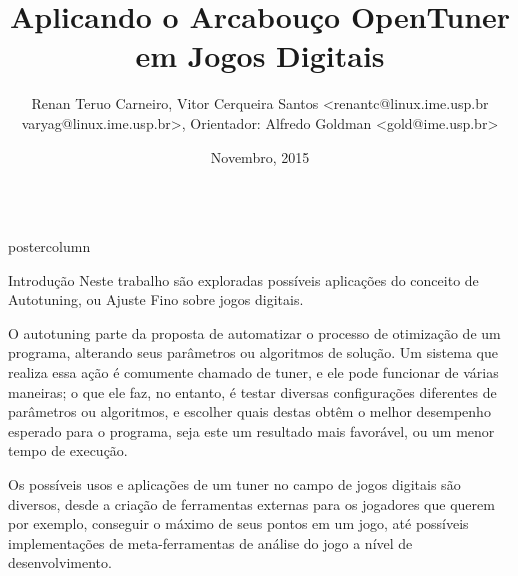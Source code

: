 \documentclass[final]{beamer}
\title{\huge Aplicando o Arcabouço OpenTuner em Jogos Digitais}
\author{Renan Teruo Carneiro, Vitor Cerqueira Santos <renantc@linux.ime.usp.br varyag@linux.ime.usp.br>, Orientador: Alfredo Goldman <gold@ime.usp.br>}
\institute[Universidade de São Paulo] %
{
  Instituto de Matemática e Estatística, Universidade de São Paulo - Trabalho
  de Conclusão de Curso
}
\date[Novembro 2015]{Novembro, 2015}
\newlength{\columnheight}
\begin{document}
\begin{frame}
  \begin{columns}
    \begin{column}{.5\textwidth}
      \begin{beamercolorbox}[center,wd=\textwidth]{postercolumn}
        \begin{minipage}[T]{.95\textwidth} %
          \parbox[t][\columnheight]{\textwidth}{ %
            
            \vspace*{0.8cm}
            
            \begin{block}{Introdução}
            \justifying
                Neste trabalho são exploradas possíveis aplicações do conceito de Autotuning, ou Ajuste Fino sobre jogos digitais. 
                                
                \vspace*{0.15cm}
                
                O autotuning parte da proposta de automatizar o processo de otimização de um programa, alterando seus parâmetros ou algoritmos de solução. Um sistema que realiza essa ação é comumente chamado de tuner, e ele pode funcionar de várias maneiras; o que ele faz, no entanto, é testar diversas configurações diferentes de parâmetros ou algoritmos, e escolher quais destas obtêm o melhor desempenho esperado para o programa, seja este um resultado mais favorável, ou um menor tempo de execução.
                
                \vspace*{0.15cm}
                
                Os possíveis usos e aplicações de um tuner no campo de jogos digitais são diversos, desde a criação de ferramentas externas para os jogadores que querem por exemplo, conseguir o máximo de seus pontos em um jogo, até possíveis implementações de meta-ferramentas de análise do jogo a nível de desenvolvimento.
                
                \vspace*{0.15cm}
                

\end{block}}
\end{minipage}
\end{beamercolorbox}
\end{column}
\end{columns}
\end{frame}
\end{document}
